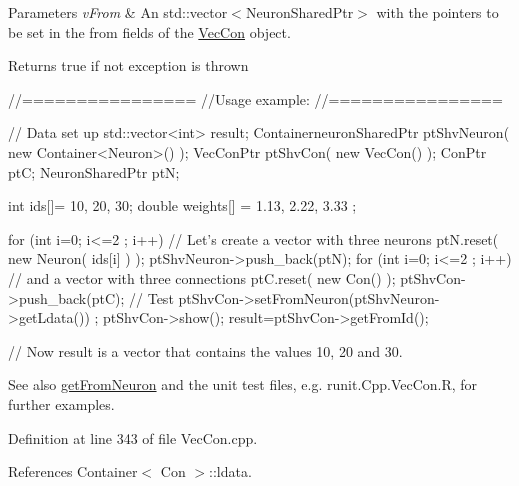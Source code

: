 \begin{DoxyParams}{Parameters}
{\em vFrom} & An std::vector$<$NeuronSharedPtr$>$ with the pointers to be set in the from fields of the \hyperlink{classvec_con}{VecCon} object.\\
\hline
\end{DoxyParams}
\begin{DoxyReturn}{Returns}
true if not exception is thrown
\end{DoxyReturn}

\begin{DoxyCode}
        //================
        //Usage example:
        //================

        // Data set up
                std::vector<int> result;
                ContainerneuronSharedPtr ptShvNeuron( new Container<Neuron>() );
                VecConPtr ptShvCon( new VecCon() );
                ConPtr    ptC;
                NeuronSharedPtr ptN;

                int ids[]= {10, 20, 30};
                double weights[] = {1.13, 2.22, 3.33 };

                for (int i=0; i<=2 ; i++) {                             // Let's 
      create a vector with three neurons
                        ptN.reset( new Neuron( ids[i] ) );
                        ptShvNeuron->push_back(ptN);
                }
                for (int i=0; i<=2 ; i++) {                             // and a 
      vector with three connections
                        ptC.reset( new Con() );
                        ptShvCon->push_back(ptC);
                }
        // Test
                ptShvCon->setFromNeuron(ptShvNeuron->getLdata()) ;
                ptShvCon->show();
                result=ptShvCon->getFromId();

        // Now result is a vector that contains the values 10, 20 and 30.
\end{DoxyCode}


\begin{DoxySeeAlso}{See also}
\hyperlink{classvec_con_ae72d00aedcd054e690f1dcf2ca5ac2c2}{getFromNeuron} and the unit test files, e.g. runit.Cpp.VecCon.R, for further examples. 
\end{DoxySeeAlso}


Definition at line 343 of file VecCon.cpp.



References Container$<$ Con $>$::ldata.


